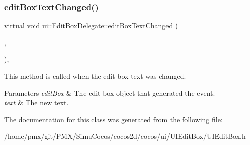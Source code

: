 \subsubsection{\texorpdfstring{edit\+Box\+Text\+Changed()}{editBoxTextChanged()}\hspace{0.1cm}{\footnotesize\ttfamily [2/2]}}
{\footnotesize\ttfamily virtual void ui\+::\+Edit\+Box\+Delegate\+::edit\+Box\+Text\+Changed (\begin{DoxyParamCaption}\item[{\hyperlink{classui_1_1EditBox}{Edit\+Box} $\ast$}]{,  }\item[{const std\+::string \&}]{ }\end{DoxyParamCaption})\hspace{0.3cm}{\ttfamily [inline]}, {\ttfamily [virtual]}}

This method is called when the edit box text was changed. 
\begin{DoxyParams}{Parameters}
{\em edit\+Box} & The edit box object that generated the event. \\
\hline
{\em text} & The new text. \\
\hline
\end{DoxyParams}


The documentation for this class was generated from the following file\+:\begin{DoxyCompactItemize}
\item 
/home/pmx/git/\+P\+M\+X/\+Simu\+Cocos/cocos2d/cocos/ui/\+U\+I\+Edit\+Box/U\+I\+Edit\+Box.\+h\end{DoxyCompactItemize}
